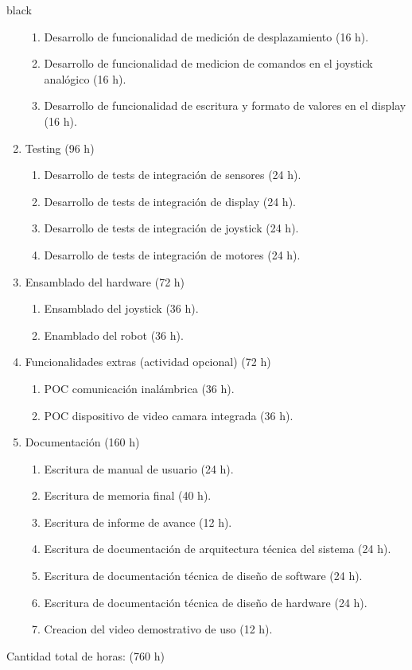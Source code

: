 \documentclass[
11pt, %
codirector, %
]{charter}
\begin{document}
\begin{consigna}{black}
\begin{enumerate}
\begin{enumerate}
	\item Desarrollo de funcionalidad de medición de desplazamiento (16 h).
	\item Desarrollo de funcionalidad de medicion de comandos en el joystick analógico (16 h).
	\item Desarrollo de funcionalidad de escritura y formato de valores en el display (16 h).
	\end{enumerate}
\item Testing (96 h)
	\begin{enumerate}
	\item Desarrollo de tests de integración de sensores (24 h).
	\item Desarrollo de tests de integración de display (24 h).
	\item Desarrollo de tests de integración de joystick (24 h).
	\item Desarrollo de tests de integración de motores (24 h).
	\end{enumerate}
\item Ensamblado del hardware (72 h)
	\begin{enumerate}
	\item Ensamblado del joystick (36 h).
	\item Enamblado del robot (36 h).
	\end{enumerate}
\item Funcionalidades extras (actividad opcional) (72 h)
	\begin{enumerate}
	\item POC comunicación inalámbrica (36 h).
	\item POC dispositivo de video camara integrada (36 h).
	\end{enumerate}
\item Documentación (160 h)
	\begin{enumerate}				
	\item Escritura de manual de usuario (24 h).			
	\item Escritura de memoria final (40 h).
	\item Escritura de informe de avance (12 h).
	\item Escritura de documentación de arquitectura técnica del sistema (24 h).
	\item Escritura de documentación técnica de diseño de software (24 h).
	\item Escritura de documentación técnica de diseño de hardware (24 h).		
	\item Creacion del video demostrativo de uso (12 h).				
	\end{enumerate}	
\end{enumerate}

Cantidad total de horas: (760 h)

\end{consigna}
\end{document}
